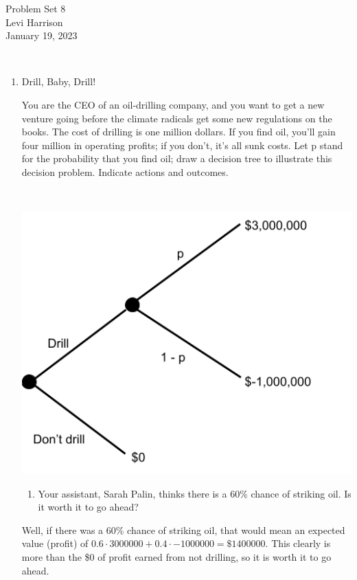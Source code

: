 \documentclass{article}
\begin{document}
\begin{center}
    \LARGE{Problem Set 8}\\[0.5em]
    \large{Levi Harrison}\\[0.5em]
    \small{January 19, 2023}
\end{center}

\,

\begin{enumerate}
    \item Drill, Baby, Drill!

          You are the CEO of an oil-drilling company, and you want to get a new venture going before the climate radicals get some new regulations on the books. The cost of drilling is one million dollars. If you find oil, you'll gain four million in operating profits; if you don't, it's all sunk costs. Let p stand for the probability that you find oil; draw a decision tree to illustrate this decision problem. Indicate actions and outcomes.

          \,

          \includegraphics[scale=0.3]{decision tree 1}

          \begin{enumerate}[label=(\alph*)]
              \item Your assistant, Sarah Palin, thinks there is a 60\% chance of striking oil. Is it worth it to go ahead?
          \end{enumerate}

          Well, if there was a 60\% chance of striking oil, that would mean an expected value (profit) of $0.6 \cdot \num{3000000} + 0.4 \cdot \num{-1000000} = \$\num{1400000}$. This clearly is more than the \$0 of profit earned from not drilling, so it is worth it to go ahead.


\end{enumerate}
\end{document}
